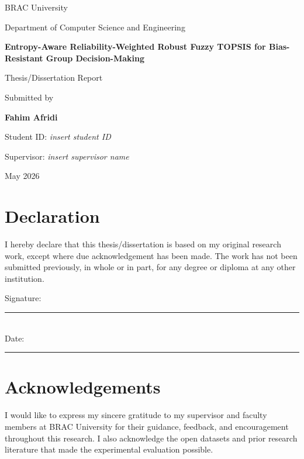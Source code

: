 \documentclass[12pt,a4paper,oneside]{report}
\newcommand{\fullmethodname}{Entropy-Aware Reliability-Weighted Robust Fuzzy TOPSIS}
\newcommand{\thesistitle}{\fullmethodname{} for Bias-Resistant Group Decision-Making}
\newcommand{\studentname}{Fahim Afridi}
\newcommand{\university}{BRAC University}
\newcommand{\department}{Department of Computer Science and Engineering}
\begin{document}
\begin{titlepage}
    \centering
    \vspace*{1cm}
    {\Large \university\par}
    \vspace{0.3cm}
    {\large \department\par}
    \vspace{2cm}
    {\Huge\bfseries \thesistitle\par}
    \vspace{1.5cm}
    {\Large Thesis/Dissertation Report\par}
    \vspace{1.5cm}
    {\large Submitted by\par}
    \vspace{0.3cm}
    {\Large\bfseries \studentname\par}
    \vspace{0.8cm}
    {\large Student ID: \textit{insert student ID}\par}
    \vspace{1.2cm}
    {\large Supervisor: \textit{insert supervisor name}\par}
    \vfill
    {\large May 2026\par}
\end{titlepage}


\chapter*{Declaration}
I hereby declare that this thesis/dissertation is based on my original research work, except where due acknowledgement has been made. The work has not been submitted previously, in whole or in part, for any degree or diploma at any other institution.

\vspace{2cm}
\noindent Signature: \rule{6cm}{0.4pt}\\
\noindent Date: \rule{4cm}{0.4pt}

\chapter*{Acknowledgements}
I would like to express my sincere gratitude to my supervisor and faculty members at BRAC University for their guidance, feedback, and encouragement throughout this research. I also acknowledge the open datasets and prior research literature that made the experimental evaluation possible.
\end{document}
